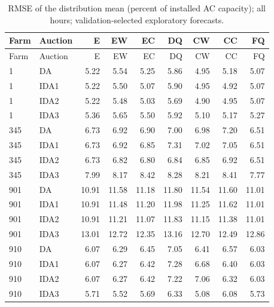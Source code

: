 \documentclass[11pt,a4paper]{article}
\begin{document}
\begin{longtable}{llrrrrrrr}
\caption{RMSE of the distribution mean (percent of installed AC capacity); all hours; validation-selected exploratory forecasts.}\\
\toprule Farm & Auction & E & EW & EC & DQ & CW & CC & FQ \\
\midrule\endfirsthead
\toprule Farm & Auction & E & EW & EC & DQ & CW & CC & FQ \\
\midrule\endhead
1 & DA & 5.22 & 5.54 & 5.25 & 5.86 & 4.95 & 5.18 & 5.07 \\
1 & IDA1 & 5.22 & 5.50 & 5.07 & 5.90 & 4.95 & 4.92 & 5.07 \\
1 & IDA2 & 5.22 & 5.48 & 5.03 & 5.69 & 4.90 & 4.95 & 5.07 \\
1 & IDA3 & 5.36 & 5.65 & 5.50 & 5.92 & 5.10 & 5.17 & 5.27 \\
\midrule
345 & DA & 6.73 & 6.92 & 6.90 & 7.00 & 6.98 & 7.20 & 6.51 \\
345 & IDA1 & 6.73 & 6.92 & 6.85 & 7.31 & 7.02 & 7.05 & 6.51 \\
345 & IDA2 & 6.73 & 6.82 & 6.80 & 6.84 & 6.85 & 6.92 & 6.51 \\
345 & IDA3 & 7.99 & 8.17 & 8.42 & 8.28 & 8.21 & 8.41 & 7.77 \\
\midrule
901 & DA & 10.91 & 11.58 & 11.18 & 11.80 & 11.54 & 11.60 & 11.01 \\
901 & IDA1 & 10.91 & 11.48 & 11.20 & 11.98 & 11.25 & 11.62 & 11.01 \\
901 & IDA2 & 10.91 & 11.21 & 11.07 & 11.83 & 11.15 & 11.38 & 11.01 \\
901 & IDA3 & 13.01 & 12.72 & 12.35 & 13.16 & 12.70 & 12.49 & 12.86 \\
\midrule
910 & DA & 6.07 & 6.29 & 6.45 & 7.05 & 6.41 & 6.57 & 6.03 \\
910 & IDA1 & 6.07 & 6.27 & 6.42 & 7.28 & 6.68 & 6.40 & 6.03 \\
910 & IDA2 & 6.07 & 6.27 & 6.42 & 7.22 & 7.06 & 6.32 & 6.03 \\
910 & IDA3 & 5.71 & 5.52 & 5.69 & 6.33 & 5.08 & 6.08 & 5.73 \\
\midrule
\bottomrule\end{longtable}
\normalsize
\small
\end{document}
